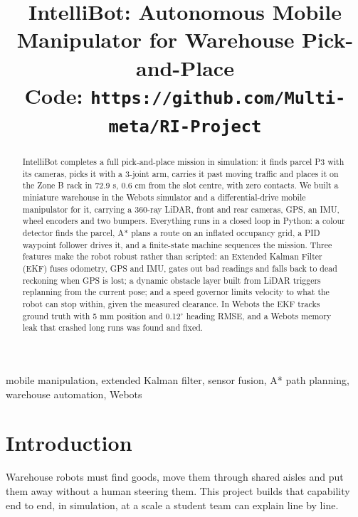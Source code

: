 \documentclass[conference]{IEEEtran}
\begin{document}
\title{IntelliBot: Autonomous Mobile Manipulator for Warehouse Pick-and-Place\\[4pt] {\normalsize Code: \texttt{https://github.com/Multi-meta/RI-Project}}}
\author{
\and
{}
\and
{}}
\maketitle
\begin{abstract}
IntelliBot completes a full pick-and-place mission in simulation: it finds parcel P3 with its cameras, picks it with a 3-joint arm, carries it past moving traffic and places it on the Zone B rack in 72.9 s, 0.6 cm from the slot centre, with zero contacts. We built a miniature warehouse in the Webots simulator and a differential-drive mobile manipulator for it, carrying a 360-ray LiDAR, front and rear cameras, GPS, an IMU, wheel encoders and two bumpers. Everything runs in a closed loop in Python: a colour detector finds the parcel, A* plans a route on an inflated occupancy grid, a PID waypoint follower drives it, and a finite-state machine sequences the mission. Three features make the robot robust rather than scripted: an Extended Kalman Filter (EKF) fuses odometry, GPS and IMU, gates out bad readings and falls back to dead reckoning when GPS is lost; a dynamic obstacle layer built from LiDAR triggers replanning from the current pose; and a speed governor limits velocity to what the robot can stop within, given the measured clearance. In Webots the EKF tracks ground truth with 5 mm position and 0.12$^\circ$ heading RMSE, and a Webots memory leak that crashed long runs was found and fixed.
\end{abstract}
\begin{IEEEkeywords}
mobile manipulation, extended Kalman filter, sensor fusion, A* path planning, warehouse automation, Webots
\end{IEEEkeywords}

\section{Introduction}
Warehouse robots must find goods, move them through shared aisles and put them away without a human steering them. This project builds that capability end to end, in simulation, at a scale a student team can explain line by line.
\end{document}
